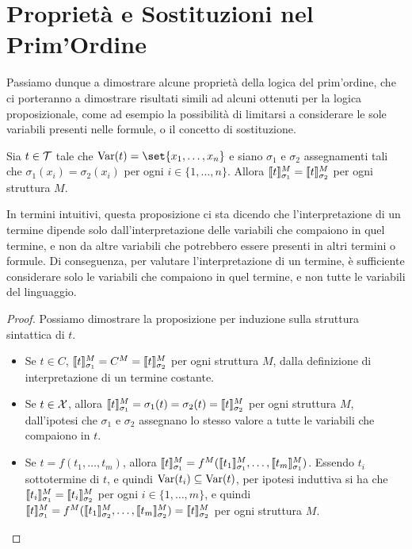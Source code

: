\section{Proprietà e Sostituzioni nel Prim'Ordine}

Passiamo dunque a dimostrare alcune proprietà della logica del prim'ordine, che ci porteranno a dimostrare risultati simili ad alcuni ottenuti per la logica proposizionale, come ad esempio la possibilità di limitarsi a considerare le sole variabili presenti nelle formule, o il concetto di sostituzione.


\begin{proposition}[label=prop:term_interpretation_independence]{}
  Sia \(t \in \mathcal{T}\) tale che \(\Var(t) = \set{x_1, \ldots, x_n}\) e siano \(\sigma_1\) e \(\sigma_2\) assegnamenti tali che \(\sigma_1(x_i) = \sigma_2(x_i)\) per ogni \(i\in\{1,\ldots,n\}\). Allora \(\den{t}[M][\sigma_1] = \den{t}[M][\sigma_2]\) per ogni struttura \(M\).
\end{proposition}

In termini intuitivi, questa proposizione ci sta dicendo che l'interpretazione di un termine dipende solo dall'interpretazione delle variabili che compaiono in quel termine, e non da altre variabili che potrebbero essere presenti in altri termini o formule. Di conseguenza, per valutare l'interpretazione di un termine, è sufficiente considerare solo le variabili che compaiono in quel termine, e non tutte le variabili del linguaggio.

\begin{proof}
  Possiamo dimostrare la proposizione per induzione sulla struttura sintattica di \(t\).
  \begin{itemize}
    \item Se \(t\in C\), \(\den{t}[M][\sigma_1] = C^M = \den{t}[M][\sigma_2]\) per ogni struttura \(M\), dalla definizione di interpretazione di un termine costante.
    \item Se \(t\in\mathcal{X}\), allora \(\den{t}[M][\sigma_1] = \sigma_1(t)= \sigma_2(t) = \den{t}[M][\sigma_2]\) per ogni struttura \(M\), dall'ipotesi che \(\sigma_1\) e \(\sigma_2\) assegnano lo stesso valore a tutte le variabili che compaiono in \(t\).
    \item Se \(t = f(t_1,\ldots,t_m)\), allora \(\den{t}[M][\sigma_1] = f^M(\den{t_1}[M][\sigma_1], \ldots, \den{t_m}[M][\sigma_1])\). Essendo \(t_i\) sottotermine di \(t\), e quindi \(\operatorname{Var}(t_i)\subseteq \operatorname{Var}(t)\), per ipotesi induttiva si ha che \(\den{t_i}[M][\sigma_1] = \den{t_i}[M][\sigma_2]\) per ogni \(i\in\{1,\ldots,m\}\), e quindi \(\den{t}[M][\sigma_1] = f^M(\den{t_1}[M][\sigma_2], \ldots, \den{t_m}[M][\sigma_2]) = \den{t}[M][\sigma_2]\) per ogni struttura \(M\).
  \end{itemize}
\end{proof}

